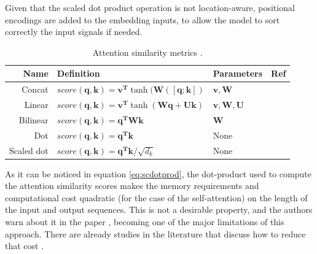 Given that the scaled dot product operation is not location-aware, positional encodings are added to the embedding inputs, to allow the model to sort correctly the input signals if needed.

\begin{table}
\caption[Attention similarity metrics]{Attention similarity metrics \autocite{uday2019}.}
\footnotesize
\centering
\begin{tabular}{r|lll}
	\toprule
	                        Name & Definition                                                                                        & Parameters                           & Ref                     \\ \midrule
	           Concat & $score(\mathbf{q}, \mathbf{k}) = \mathbf{v^T} \tanh(\mathbf{W}([\mathbf{q};\mathbf{k}])$          & $\mathbf{v}, \mathbf{W}$             & \autocite{Luong2015}    \\
	           Linear  & $score(\mathbf{q}, \mathbf{k}) = \mathbf{v^T} \tanh(\mathbf{W}\mathbf{q} + \mathbf{U}\mathbf{k})$ & $\mathbf{v}, \mathbf{W}, \mathbf{U}$ & \autocite{bahdanau2015} \\
	   Bilinear & $score(\mathbf{q}, \mathbf{k}) =  \mathbf{q^T} \mathbf{W} \mathbf{k}$                             & $\mathbf{W}$                         & \autocite{Luong2015}    \\
	       Dot & $score(\mathbf{q}, \mathbf{k}) = \mathbf{q^T}  \mathbf{k}$                                        & None                                 & \autocite{vaswani2017}  \\
	Scaled dot   & $score(\mathbf{q}, \mathbf{k}) =  \mathbf{q^T} \mathbf{k} / \sqrt{d_k}$                           & None                                 & \autocite{Luong2015}    \\ \bottomrule
\end{tabular}
\label{table:attentionsimilarities}
\end{table}

As it can be noticed in equation \ref{eq:scdotprod}, the dot-product used to compute the attention similarity scores makes the memory requirements and computational cost quadratic (for the case of the self-attention) on the length of the input and output sequences. This is not a desirable property, and the authors warn about it in the paper \autocite{vaswani2017}, becoming one of the major limitations of this approach. There are already studies in the literature that discuss how to reduce that cost \autocite{jaegle2021, so2021}.

